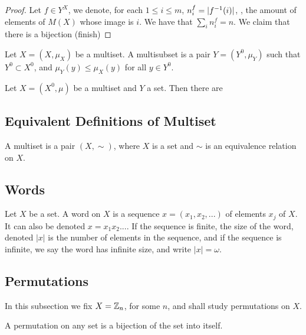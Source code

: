 \begin{proof}
	Let $f \in Y^X$, we denote, for each $1 \leq i \leq m$, $n_i^f=|f^{-1}(i)|$, \ie, the amount of elements of $M(X)$ whose image is $i$. We have that $\sum_i n_i^f = n$. We claim that there is a bijection (finish)
\end{proof}

\begin{definition}
	Let $X=(X, \mu_X)$ be a multiset. A multisubset is a pair $Y=(Y^0, \mu_Y)$ such that $Y^0 \subset X^0$, and $\mu_Y(y)\leq\mu_X(y)$ for all $y \in Y^0$.
\end{definition}

\begin{proposition}
	Let $X=(X^0, \mu)$ be a multiset and $Y$ a set. Then there are 
\end{proposition}



\subsection{Equivalent Definitions of Multiset}

\begin{definition}
	A multiset is a pair $(X, \sim)$, where $X$ is a set and $\sim$ is an equivalence relation on $X$.
\end{definition}

\subsection{Words}

Let $X$ be a set. A word on $X$ is a sequence $x = (x_1, x_2, ...)$ of elements $x_j$ of $X$. It can also be denoted $x=x_1x_2...$. If the sequence is finite, the size of the word, denoted $|x|$ is the number of elements in the sequence, and if the sequence is infinite, we say the word has infinite size, and write $|x| = \omega$.



\subsection{Permutations}

In this subsection we fix $X = \mathbb{Z}_n$, for some $n$, and shall study permutations on $X$. 

\begin{definition}
	A permutation on any set is a bijection of the set into itself.
\end{definition}

